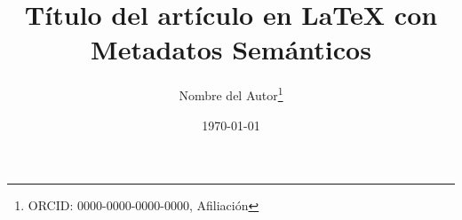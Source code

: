 
\title{Título del artículo en LaTeX con Metadatos Semánticos}  
\author{Nombre del Autor\thanks{ORCID: 0000-0000-0000-0000, Afiliación}}  
\date{\today}  


\usepackage{ccicons}
\newcommand{\licencia}{\ccby \ccnc \ccsa}

\usepackage{xmpincl} %

